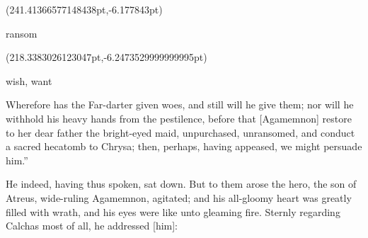 \documentclass{ransom}
\begin{document}
\begin{foreignpage}
{\begin{textblock*}{42.0pt}(241.41366577148438pt,\pdfpageheight-152.37759399414062pt-6.177843pt)\parbox[b]{42.0pt}{\begin{blacktext}\begin{latin}ransom\end{latin}\end{blacktext}}\end{textblock*}
\begin{textblock*}{46.77136pt}(218.3383026123047pt,\pdfpageheight-125.37759399414062pt-6.2473529999999995pt)\parbox[b]{46.77136pt}{\begin{blacktext}\begin{latin}wish, want\end{latin}\end{blacktext}}\end{textblock*}
 }
\end{foreignpage}


Wherefore has the Far-darter given woes, and still will he
give them; nor will he withhold his heavy hands from the pestilence,
before that [Agamemnon] restore to her dear father the bright-eyed
maid, unpurchased, unransomed, and conduct a sacred hecatomb to Chrysa;
then, perhaps, having appeased, we might persuade him.”


He indeed, having thus spoken, sat down. But to them arose the hero,
the son of Atreus, wide-ruling Agamemnon, agitated; and his
all-gloomy heart was greatly filled with wrath, and his eyes were like
unto gleaming fire. Sternly regarding Calchas most of all, he addressed
[him]:
\end{document}
